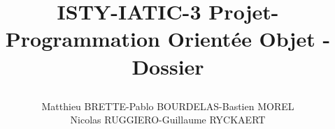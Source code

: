 \documentclass{report}
\begin{document}
\title{%
    \begin{minipage}\linewidth
        \centering
        ISTY-IATIC-3
        \vskip 3pt
        \large Projet-Programmation Orientée Objet - Dossier
    \author{Matthieu BRETTE-Pablo BOURDELAS-Bastien MOREL\\Nicolas RUGGIERO-Guillaume RYCKAERT}
    \end{minipage}
 }
 \maketitle
 
 
\end{document}
